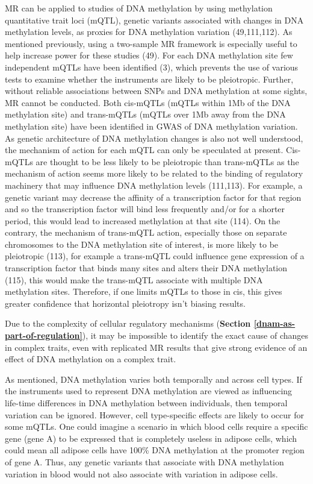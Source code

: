 \documentclass[11pt,oneside]{bristolthesis}
\begin{document}
MR can be applied to studies of DNA methylation by using methylation quantitative trait loci (mQTL), genetic variants associated with changes in DNA methylation levels, as proxies for DNA methylation variation (49,111,112). As mentioned previously, using a two-sample MR framework is especially useful to help increase power for these studies (49). For each DNA methylation site few independent mQTLs have been identified (3), which prevents the use of various tests to examine whether the instruments are likely to be pleiotropic. Further, without reliable associations between SNPs and DNA methylation at some sights, MR cannot be conducted. Both cis-mQTLs (mQTLs within 1Mb of the DNA methylation site) and trans-mQTLs (mQTLs over 1Mb away from the DNA methylation site) have been identified in GWAS of DNA methylation variation. As genetic architecture of DNA methylation changes is also not well understood, the mechanism of action for each mQTL can only be speculated at present. Cis-mQTLs are thought to be less likely to be pleiotropic than trans-mQTLs as the mechanism of action seems more likely to be related to the binding of regulatory machinery that may influence DNA methylation levels (111,113). For example, a genetic variant may decrease the affinity of a transcription factor for that region and so the transcription factor will bind less frequently and/or for a shorter period, this would lead to increased methylation at that site (114). On the contrary, the mechanism of trans-mQTL action, especially those on separate chromosomes to the DNA methylation site of interest, is more likely to be pleiotropic (113), for example a trans-mQTL could influence gene expression of a transcription factor that binds many sites and alters their DNA methylation (115), this would make the trans-mQTL associate with multiple DNA methylation sites. Therefore, if one limits mQTLs to those in cis, this gives greater confidence that horizontal pleiotropy isn't biasing results.

Due to the complexity of cellular regulatory mechanisms (\textbf{Section \ref{dnam-as-part-of-regulation}}), it may be impossible to identify the exact cause of changes in complex traits, even with replicated MR results that give strong evidence of an effect of DNA methylation on a complex trait.

As mentioned, DNA methylation varies both temporally and across cell types. If the instruments used to represent DNA methylation are viewed as influencing life-time differences in DNA methylation between individuals, then temporal variation can be ignored. However, cell type-specific effects are likely to occur for some mQTLs. One could imagine a scenario in which blood cells require a specific gene (gene A) to be expressed that is completely useless in adipose cells, which could mean all adipose cells have 100\% DNA methylation at the promoter region of gene A. Thus, any genetic variants that associate with DNA methylation variation in blood would not also associate with variation in adipose cells.
\end{document}
